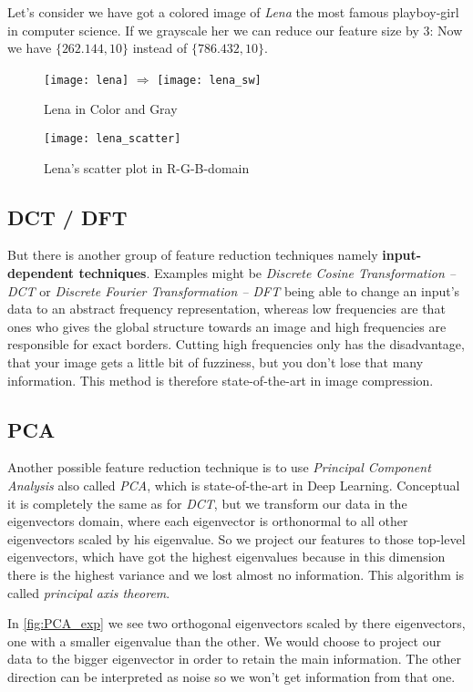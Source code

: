 \documentclass[dvipsnames,twocolumn]{scrartcl}
\begin{document}
	Let's consider we have got a colored image of \emph{Lena} the most famous playboy-girl in computer science. If we grayscale her we can reduce our feature size by 3: Now we have $\{262.144, 10\}$ instead of $\{786.432, 10\}$.
	\begin{figure}
		\caption{Lena in Color and Gray}
		\texttt{[image: lena]}
		$\Rightarrow$
		\texttt{[image: lena\_sw]}
	\end{figure}
	\begin{figure}
		\caption{Lena's scatter plot in R-G-B-domain}
		\texttt{[image: lena\_scatter]}
	\end{figure}
	
	\subsection{DCT / DFT}
	
	But there is another group of feature reduction techniques namely \textbf{input-dependent techniques}. Examples might be \emph{Discrete Cosine Transformation -- DCT} or \emph{Discrete Fourier Transformation -- DFT} being able to change an input's data to an abstract frequency representation, whereas low frequencies are that ones who gives the global structure towards an image and high frequencies are responsible for exact borders. Cutting high frequencies only has the disadvantage, that your image gets a little bit of fuzziness, but you don't lose that many information. This method is therefore state-of-the-art in image compression.
	
	\subsection{PCA}
	
	Another possible feature reduction technique is to use \emph{Principal Component Analysis} also called \emph{PCA}, which is state-of-the-art in Deep Learning. Conceptual it is completely the same as for \emph{DCT}, but we transform our data in the eigenvectors domain, where each eigenvector is orthonormal to all other eigenvectors scaled by his eigenvalue. So we project our features to those top-level eigenvectors, which have got the highest eigenvalues because in this dimension there is the highest variance and we lost almost no information. This algorithm is called \emph{principal axis theorem}.
	
	In \autoref{fig:PCA_exp} we see two orthogonal eigenvectors scaled by there eigenvectors, one with a smaller eigenvalue than the other. We would choose to project our data to the bigger eigenvector in order to retain the main information. The other direction can be interpreted as noise so we won't get information from that one.\\
	
\end{document}
